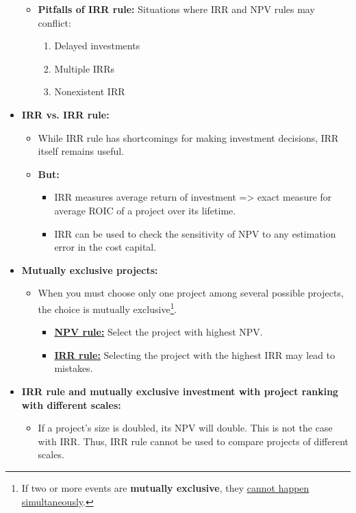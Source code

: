 \documentclass[ieeetran]{article}
\begin{document}
\begin{itemize}
\begin{itemize}
\begin{itemize}
		  \end{itemize}
	  \item \textbf{Pitfalls of IRR rule:} Situations where IRR and NPV rules may conflict:
		\begin{enumerate}
		  \item Delayed investments
			  \item Multiple IRRs
				  \item Nonexistent IRR
		\end{enumerate}
		  \end{itemize}

\item \textbf{IRR vs. IRR rule:}
	\begin{itemize}
	  \item While IRR rule has shortcomings for making investment decisions, IRR itself remains useful.
	\item \textbf{But:}
		\begin{itemize}
		  \item IRR measures average return of investment => exact measure for average ROIC  of a project over its lifetime.
		  \item IRR can be used to check the sensitivity of NPV to any estimation error in the cost capital.
		\end{itemize}
	\end{itemize}
\item \textbf{Mutually exclusive projects:}
	\begin{itemize}
		\item When you must choose only one project among several possible projects, the choice is mutually exclusive\footnote{If two or more events are \textbf{mutually exclusive}, they \underline{cannot happen simultaneously}.}.
			\begin{itemize}
			  \item \underline{\textbf{NPV rule:}} Select the project with highest NPV.

			  \item \underline{\textbf{IRR rule:}} Selecting the project with the highest IRR may lead to mistakes.
			\end{itemize}
	\end{itemize}

\item \textbf{IRR rule and mutually exclusive investment with project ranking with different scales:}
	\begin{itemize}
	  \item If a project's size is doubled, its NPV will double. This is not the case with IRR. Thus, IRR rule cannot be used to compare projects of different scales.
	\end{itemize}


\end{itemize}
\end{document}
